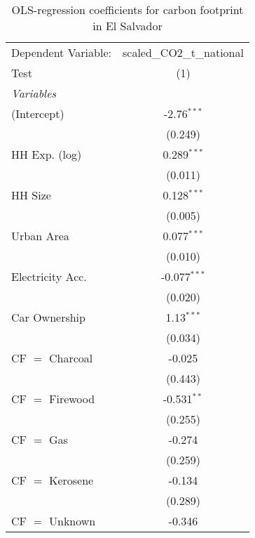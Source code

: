 
\begin{table}[htbp!]
   \centering
   \small
   \begin{adjustbox}{width = 1\textwidth, max height = 0.95\textheight, center}
      \begin{threeparttable}[b]
         \caption{\label{tab:OLS_2_SLV} OLS-regression coefficients for carbon footprint in El Salvador}
         \begin{tabular}{lc}
            \tabularnewline \midrule \midrule
            Dependent Variable: & scaled\_CO2\_t\_national\\     
            Test                & (1)\\  
            \midrule
            \emph{Variables}\\
            (Intercept)         & -2.76$^{***}$\\   
                                & (0.249)\\   
            HH Exp. (log)       & 0.289$^{***}$\\   
                                & (0.011)\\   
            HH Size             & 0.128$^{***}$\\   
                                & (0.005)\\   
            Urban Area          & 0.077$^{***}$\\   
                                & (0.010)\\   
            Electricity Acc.    & -0.077$^{***}$\\   
                                & (0.020)\\   
            Car Ownership       & 1.13$^{***}$\\   
                                & (0.034)\\   
            CF $=$ Charcoal     & -0.025\\   
                                & (0.443)\\   
            CF $=$ Firewood     & -0.531$^{**}$\\   
                                & (0.255)\\   
            CF $=$ Gas          & -0.274\\   
                                & (0.259)\\   
            CF $=$ Kerosene     & -0.134\\   
                                & (0.289)\\   
            CF $=$ Unknown      & -0.346\\   

\end{tabular}
\end{threeparttable}
\end{adjustbox}
\end{table}
